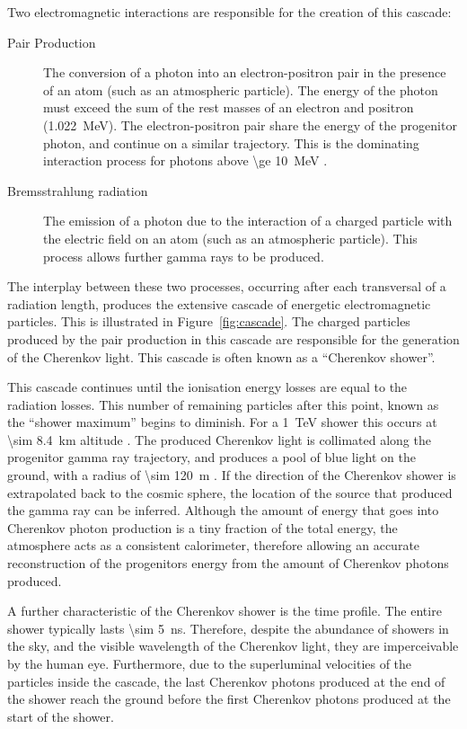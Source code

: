Two electromagnetic interactions are responsible for the creation of this cascade:
\begin{description}
\item [Pair Production] The conversion of a photon into an electron-positron pair in the presence of an atom (such as an atmospheric particle). The energy of the photon must exceed the sum of the rest masses of an electron and positron (\SI{1.022}{MeV}). The electron-positron pair share the energy of the progenitor photon, and continue on a similar trajectory. This is the dominating interaction process for photons above \SI{\ge 10}{MeV} \cite{Weekes2003}.
\item [Bremsstrahlung radiation] The emission of a photon due to the interaction of a charged particle with the electric field on an atom (such as an atmospheric particle). This process allows further gamma rays to be produced.
\end{description}
The interplay between these two processes, occurring after each transversal of a radiation length, produces the extensive cascade of energetic electromagnetic particles. This is illustrated in Figure~\ref{fig:cascade}. The charged particles produced by the pair production in this cascade are responsible for the generation of the Cherenkov light. This cascade is often known as a ``Cherenkov shower''.

This cascade continues until the ionisation energy losses are equal to the radiation losses. This number of remaining particles after this point, known as the ``shower maximum'' begins to diminish. For a \SI{1}{TeV} shower this occurs at \SI{\sim 8.4}{km} altitude \cite{Weekes2003}. The produced Cherenkov light is collimated along the progenitor gamma ray trajectory, and produces a pool of blue light on the ground, with a radius of \SI{\sim 120}{m} \cite{Hillas1996a}. If the direction of the Cherenkov shower is extrapolated back to the cosmic sphere, the location of the source that produced the gamma ray can be inferred. Although the amount of energy that goes into Cherenkov photon production is a tiny fraction of the total energy, the atmosphere acts as a consistent calorimeter, therefore allowing an accurate reconstruction of the progenitors energy from the amount of Cherenkov photons produced. 

A further characteristic of the Cherenkov shower is the time profile. The entire shower typically lasts \SI{\sim 5}{ns}. Therefore, despite the abundance of showers in the sky, and the visible wavelength of the Cherenkov light, they are imperceivable by the human eye. Furthermore, due to the superluminal velocities of the particles inside the cascade, the last Cherenkov photons produced at the end of the shower reach the ground before the first Cherenkov photons produced at the start of the shower.

